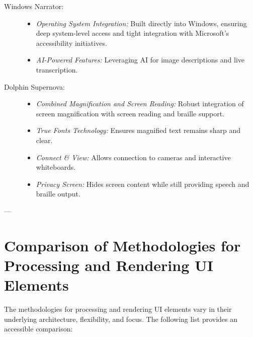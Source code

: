 \begin{description}
\begin{itemize}
    \end{itemize}
    \item[Windows Narrator:]
    \begin{itemize}
        \item \emph{Operating System Integration:} Built directly into Windows, ensuring deep system-level access and tight integration with Microsoft's accessibility initiatives. \cite{NarratorGuide}
        \item \emph{AI-Powered Features:} Leveraging AI for image descriptions and live transcription. \cite{NarratorImageDescriptions, NarratorWhatsNew}
    \end{itemize}
    \item[Dolphin Supernova:]
    \begin{itemize}
        \item \emph{Combined Magnification and Screen Reading:} Robust integration of screen magnification with screen reading and braille support. \cite{SuperNovaFeatures}
        \item \emph{True Fonts Technology:} Ensures magnified text remains sharp and clear. \cite{SuperNovaFeatures}
        \item \emph{Connect \& View:} Allows connection to cameras and interactive whiteboards. \cite{SuperNovaFeatures}
        \item \emph{Privacy Screen:} Hides screen content while still providing speech and braille output. \cite{SuperNovaFeatures}
    \end{itemize}
\end{description}

---

\section{Comparison of Methodologies for Processing and Rendering UI Elements}
\label{sec:comparison-methodologies}

The methodologies for processing and rendering UI elements vary in their underlying architecture, flexibility, and focus. The following list provides an accessible comparison:

